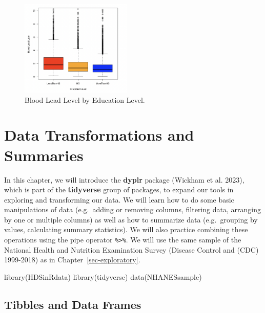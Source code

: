 \documentclass[
  letterpaper,
]{krantz}
\makeatletter
\newenvironment{Shaded}{\begin{snugshade}}{\end{snugshade}}
\newcommand{\FunctionTok}[1]{\textcolor[rgb]{0.28,0.35,0.67}{#1}}
\newcommand{\NormalTok}[1]{\textcolor[rgb]{0.00,0.23,0.31}{#1}}
\newenvironment{kframe}{%
\medskip{}
\setlength{\fboxsep}{.8em}
 \def\at@end@of@kframe{}%
 \ifinner\ifhmode%
  \def\at@end@of@kframe{\end{minipage}}%
  \begin{minipage}{\columnwidth}%
 \fi\fi%
 \def\FrameCommand##1{\hskip\@totalleftmargin \hskip-\fboxsep
 \colorbox{shadecolor}{##1}\hskip-\fboxsep
     \hskip-\linewidth \hskip-\@totalleftmargin \hskip\columnwidth}%
 \MakeFramed {\advance\hsize-\width
   \@totalleftmargin\z@ \linewidth\hsize
   \@setminipage}}%
 {\par\unskip\endMakeFramed%
 \at@end@of@kframe}
\renewenvironment{Shaded}{\begin{kframe}}{\end{kframe}}
\makeatother
\begin{document}
\begin{figure}

{\centering \includegraphics[width=2.08333in,height=\textheight]{book/images/4-exercise4plot2.png}

}

\caption{\label{fig-q42}Blood Lead Level by Education Level.}

\end{figure}


\hypertarget{sec-transformations-summaries}{%
\chapter{Data Transformations and
Summaries}\label{sec-transformations-summaries}}

In this chapter, we will introduce the \textbf{dyplr} package (Wickham
et al. 2023), which is part of the \textbf{tidyverse} group of packages,
to expand our tools in exploring and transforming our data. We will
learn how to do some basic manipulations of data (e.g.~adding or
removing columns, filtering data, arranging by one or multiple columns)
as well as how to summarize data (e.g.~grouping by values, calculating
summary statistics). We will also practice combining these operations
using the pipe operator \texttt{\%\textgreater{}\%}. We will use the
same sample of the National Health and Nutrition Examination Survey
(Disease Control and (CDC) 1999-2018) as in
Chapter~\ref{sec-exploratory}.

\begin{Shaded}
\begin{Highlighting}[]
\FunctionTok{library}\NormalTok{(HDSinRdata)}
\FunctionTok{library}\NormalTok{(tidyverse)}
\FunctionTok{data}\NormalTok{(NHANESsample)}
\end{Highlighting}
\end{Shaded}

\hypertarget{tibbles-and-data-frames}{%
\section{Tibbles and Data Frames}\label{tibbles-and-data-frames}}
\end{document}
